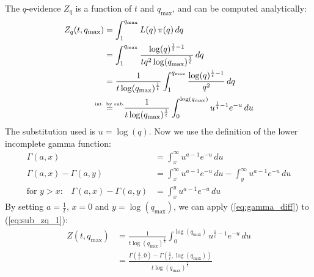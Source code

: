 \documentclass[12pt, a4paper]{report}
\begin{document}
The $q$-evidence $Z_q$ is a function of $t$ and $q_{\textrm{max}}$, and can be computed analytically:
\begin{align}
    Z_q(t, q_{\textrm{max}}) &= \int_1^{q_{\textrm{max}}} L(q) \, \pi(q) \, dq \nonumber\\
    &= \int_1^{q_{\textrm{max}}} \frac{\log(q)^{\frac{1}{t}-1}}{tq^2\log(q_{\textrm{max}})^\frac{1}{t}} \, dq \nonumber\\
    &= \frac{1}{t \log(q_{\textrm{max}})^{\frac{1}{t}}} \int_1^{q_{\textrm{max}}} \frac{\log(q)^{\frac{1}{t}-1}}{q^2} \, dq \nonumber\\
    &\mathrel{\overset{\makebox[0pt]{\mbox{\normalfont\tiny int. by sub.}}}{=}} \quad \frac{1}{t \log(q_{\textrm{max}})^{\frac{1}{t}}} \int_0^{\log(q_{\textrm{max}})} u^{\frac{1}{t}-1} e^{-u} \, du \label{eq:sub_zq_1}
\end{align}
The substitution used is $u = \log(q)$.
Now we use the definition of the lower incomplete gamma function:
\begin{align}
    \Gamma(a, x) &= \int_x^{\infty} u^{a-1} e^{-u} \, du \nonumber\\
    \Gamma(a, x) - \Gamma(a, y) &= \int_x^{\infty} u^{a-1} e^{-u} \, du - \int_y^{\infty} u^{a-1} e^{-u} \, du \nonumber\\
    \textrm{for } y > x\textrm{:} \quad \Gamma(a, x) - \Gamma(a, y) &= \int_x^y u^{a-1} e^{-u} \, du \label{eq:gamma_diff}
\end{align}
By setting $a = \frac{1}{t}$, $x = 0$ and $y = \log(q_{\textrm{max}})$, we can apply (\ref{eq:gamma_diff}) to (\ref{eq:sub_zq_1}):
\begin{align*}
    Z(t, q_{\textrm{max}}) &= \frac{1}{t \log(q_{\textrm{max}})^{\frac{1}{t}}} \int_0^{\log(q_{\textrm{max}})} u^{\frac{1}{t}-1} e^{-u} \, du \\
    &= \frac{\Gamma(\frac{1}{t}, 0) - \Gamma(\frac{1}{t}, \log(q_{\textrm{max}}))}{t \log(q_{\textrm{max}})^{\frac{1}{t}}}
\end{align*}
\end{document}
